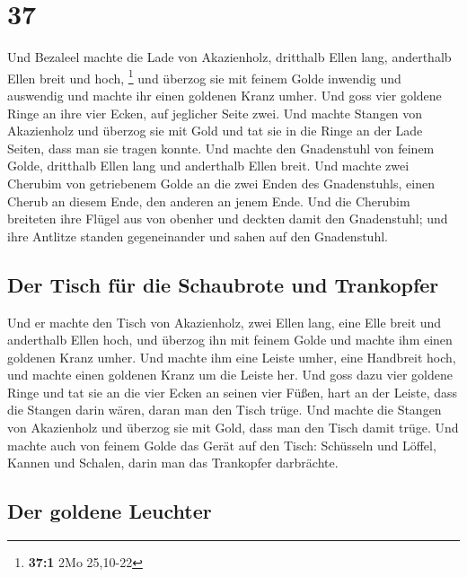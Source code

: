 \hypertarget{section-36}{%
\section{37}\label{section-36}}

 Und Bezaleel machte die Lade von Akazienholz, dritthalb
Ellen lang, anderthalb Ellen breit und hoch, \footnote{\textbf{37:1} 2Mo
  25,10-22}  und überzog sie mit feinem Golde inwendig und
auswendig und machte ihr einen goldenen Kranz umher.  Und
goss vier goldene Ringe an ihre vier Ecken, auf jeglicher Seite zwei.
 Und machte Stangen von Akazienholz und überzog sie mit
Gold  und tat sie in die Ringe an der Lade Seiten, dass
man sie tragen konnte.  Und machte den Gnadenstuhl von
feinem Golde, dritthalb Ellen lang und anderthalb Ellen breit.
 Und machte zwei Cherubim von getriebenem Golde an die
zwei Enden des Gnadenstuhls,  einen Cherub an diesem Ende,
den anderen an jenem Ende.  Und die Cherubim breiteten
ihre Flügel aus von obenher und deckten damit den Gnadenstuhl; und ihre
Antlitze standen gegeneinander und sahen auf den Gnadenstuhl.

\hypertarget{der-tisch-fuxfcr-die-schaubrote-und-trankopfer}{%
\subsection{Der Tisch für die Schaubrote und
Trankopfer}\label{der-tisch-fuxfcr-die-schaubrote-und-trankopfer}}

 Und er machte den Tisch von Akazienholz, zwei Ellen
lang, eine Elle breit und anderthalb Ellen hoch,  und
überzog ihn mit feinem Golde und machte ihm einen goldenen Kranz umher.
 Und machte ihm eine Leiste umher, eine Handbreit hoch,
und machte einen goldenen Kranz um die Leiste her.  Und
goss dazu vier goldene Ringe und tat sie an die vier Ecken an seinen
vier Füßen,  hart an der Leiste, dass die Stangen darin
wären, daran man den Tisch trüge.  Und machte die Stangen
von Akazienholz und überzog sie mit Gold, dass man den Tisch damit
trüge.  Und machte auch von feinem Golde das Gerät auf
den Tisch: Schüsseln und Löffel, Kannen und Schalen, darin man das
Trankopfer darbrächte.

\hypertarget{der-goldene-leuchter}{%
\subsection{Der goldene Leuchter}\label{der-goldene-leuchter}}

